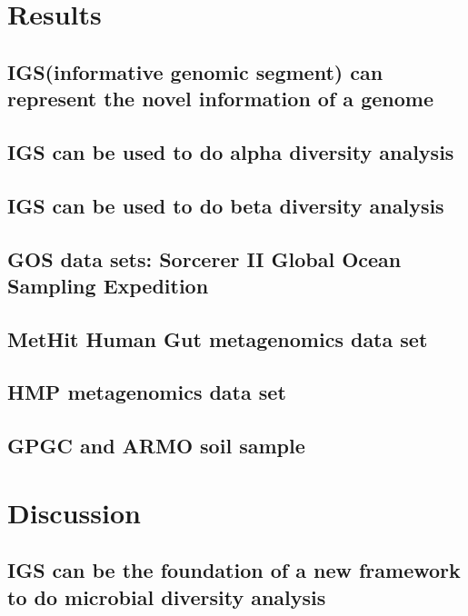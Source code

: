 \section{Results}

\subsection{IGS(informative genomic segment) can represent the novel information of a genome}



\subsection{IGS can be used to do alpha diversity analysis}



\subsection{IGS can be used to do beta diversity analysis}


\subsection{GOS data sets: Sorcerer II Global Ocean Sampling Expedition}

\subsection{MetHit Human Gut metagenomics data set}

\subsection{HMP metagenomics data set}

\subsection{GPGC and ARMO soil sample}

\section{Discussion}

\subsection{IGS can be the foundation of a new framework to do microbial diversity analysis}


